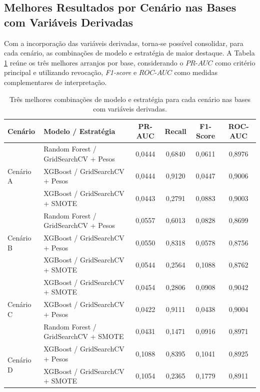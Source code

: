 \subsection{Melhores Resultados por Cenário nas Bases com Variáveis Derivadas}
\label{subsec:melhores_resultados_por_cenario_com_feat}

Com a incorporação das variáveis derivadas, torna-se possível consolidar, para cada cenário, as combinações de modelo e estratégia de maior destaque. A Tabela \ref{tab:melhores_por_cenario_com_feat} reúne os três melhores arranjos por base, considerando o $PR\text{-}AUC$ como critério principal e utilizando revocação, \textit{F1-score} e $ROC\text{-}AUC$ como medidas complementares de interpretação.

\begin{table}[ht]
\centering
\caption{Três melhores combinações de modelo e estratégia para cada cenário nas bases com variáveis derivadas.}
\label{tab:melhores_por_cenario_com_feat}
\small
\begin{tabular}{llcccc}
\toprule
\textbf{Cenário} & \textbf{Modelo / Estratégia} & \textbf{PR-AUC} & \textbf{Recall} & \textbf{F1-Score} & \textbf{ROC-AUC} \\
\midrule
\multirow{3}{*}{Cenário A}
& Random Forest / GridSearchCV + Pesos & 0,0444 & 0,6840 & 0,0611 & 0,8976 \\
& XGBoost / GridSearchCV + Pesos & 0,0444 & 0,9120 & 0,0447 & 0,9006 \\
& XGBoost / GridSearchCV + SMOTE & 0,0443 & 0,2791 & 0,0883 & 0,9003 \\
\midrule
\multirow{3}{*}{Cenário B}
& Random Forest / GridSearchCV + Pesos & 0,0557 & 0,6013 & 0,0828 & 0,8699 \\
& XGBoost / GridSearchCV + Pesos & 0,0550 & 0,8318 & 0,0578 & 0,8756 \\
& XGBoost / GridSearchCV + SMOTE & 0,0544 & 0,2564 & 0,1088 & 0,8762 \\
\midrule
\multirow{3}{*}{Cenário C}
& XGBoost / GridSearchCV + SMOTE & 0,0454 & 0,2806 & 0,0908 & 0,9042 \\
& XGBoost / GridSearchCV + Pesos & 0,0422 & 0,9111 & 0,0438 & 0,9004 \\
& Random Forest / GridSearchCV + SMOTE & 0,0431 & 0,1471 & 0,0916 & 0,8971 \\
\midrule
\multirow{3}{*}{Cenário D}
& XGBoost / GridSearchCV + Pesos & 0,1088 & 0,8395 & 0,1041 & 0,8925 \\
& XGBoost / GridSearchCV + SMOTE & 0,1054 & 0,2365 & 0,1779 & 0,8911 \\

\end{tabular}
\end{table}
